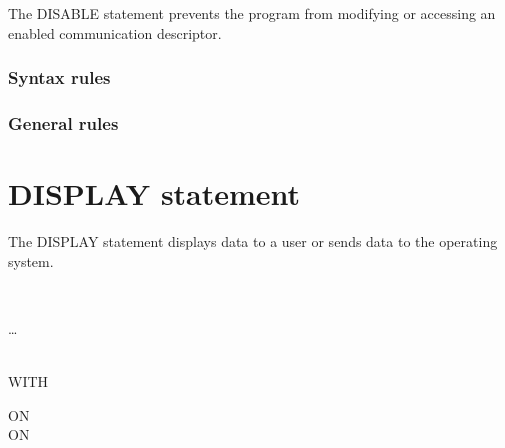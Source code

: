 The DISABLE statement prevents the program from modifying or accessing an enabled communication descriptor.

\begin{syntax}[\deletedcolour]
\end{syntax}

\subsubsection{Syntax rules}

\subsubsection{General rules}

\section{DISPLAY statement}

The DISPLAY statement displays data to a user or sends data to the operating system.

\begin{syntax}
  \begin{1=}
    \identifier \\
    \literal
  \end{1=} \ldots
  \begin{0+}
     \mnemonicname \\
    WITH  
  \end{0+}

  \begin{0+}
    ON  \imperativestatement \\
     ON  \imperativestatement \\
  \end{0+}

  \begin{0-1}
  \end{0-1}
\end{syntax}

